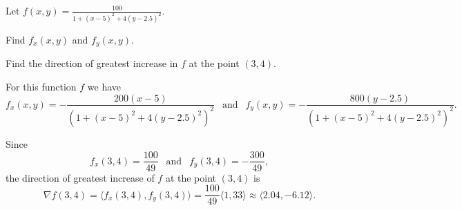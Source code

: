 \begin{activity} \label{A:10.6.4} Let $f(x,y) = \frac{100}{1+(x-5)^2 + 4(y-2.5)^2}$.
    \ba
    \item Find $f_x(x,y)$ and $f_y(x,y)$.



    \item Find the direction of greatest increase in $f$ at the point $(3,4)$.



    \ea


\end{activity}
\begin{smallhint}

\end{smallhint}
\begin{bighint}

\end{bighint}
\begin{activitySolution}
\ba 
\item For this function $f$ we have 
\[f_x(x,y) = -\frac{200(x-5)}{(1+(x-5)^2 + 4(y-2.5)^2)^2} \ \ \text{ and } \ \ f_y(x,y) = -\frac{800(y-2.5)}{(1+(x-5)^2 + 4(y-2.5)^2)^2}.\]

\item Since
\[f_x(3,4) = \frac{100}{49} \ \ \text{ and } \ \ f_y(3,4) = -\frac{300}{49},\]
the direction of greatest increase of $f$ at the point $(3,4)$ is 
\[\nabla f (3,4) = \langle f_x(3,4), f_y(3,4) \rangle = \frac{100}{49} \langle 1, 33 \rangle \approx \langle 2.04, -6.12 \rangle.\]

\ea

\end{activitySolution}
\aftera

